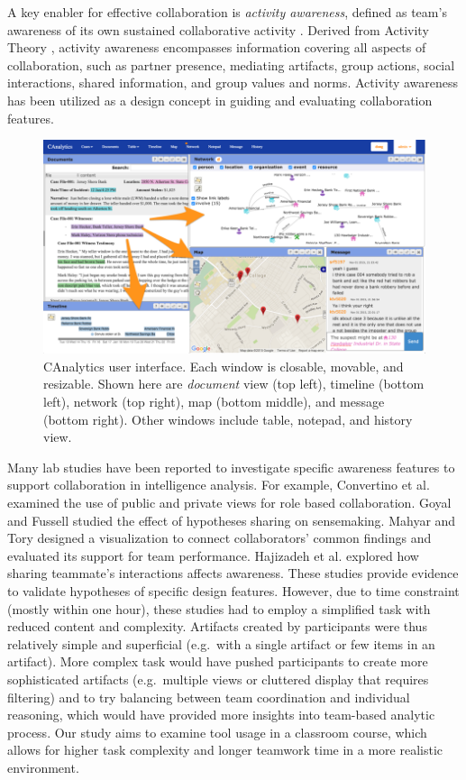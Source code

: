 A key enabler for effective collaboration is \emph{activity awareness}, defined as
team's awareness of its own sustained collaborative activity
\cite{Carroll2003,Carroll2006}. Derived from Activity Theory \cite{Leontev1974},
activity awareness encompasses information covering all aspects of collaboration, such as partner presence, mediating artifacts, group actions, social interactions, shared information, and group values and norms. Activity awareness has been utilized as a design concept in guiding and evaluating collaboration features.

\begin{figure}
\centering
\includegraphics[width=2\columnwidth]{./img/interface.png}
\caption{CAnalytics user interface. Each window is closable, movable, and resizable. Shown here are \emph{document} view (top left), timeline (bottom left), network (top right), map (bottom middle), and message (bottom right). Other windows include table, notepad, and history view. }\label{fig:canalytics}
\end{figure}

Many lab studies have been reported to investigate specific awareness features
to support collaboration in intelligence analysis. For example, Convertino et
al. \cite{Convertino2011} examined the use of public and private views for role
based collaboration. Goyal and Fussell \cite{Goyal2016} studied the effect of
hypotheses sharing on sensemaking. Mahyar and Tory \cite{Mahyar2013b} designed a
visualization to connect collaborators' common findings and evaluated its
support for team performance. Hajizadeh et al. \cite{Hajizadeh2013} explored how
sharing teammate's interactions affects awareness. These studies provide
evidence to validate hypotheses of specific design features. However, due to
time constraint (mostly within one hour), these studies had to employ a
simplified task with reduced content and complexity. Artifacts created by
participants were thus relatively simple and superficial (e.g.~with a single
artifact or few items in an artifact). More complex task would have pushed
participants to create more sophisticated artifacts (e.g.~multiple views or
cluttered display that requires filtering) and to try balancing between team
coordination and individual reasoning, which would have provided more insights
into team-based analytic process. Our study aims to examine tool usage in a
classroom course, which allows for higher task complexity and longer teamwork
time in a more realistic environment.

